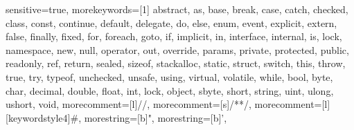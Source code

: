 {
	sensitive=true,
	morekeywords=[1]{
		abstract, as, base, break, case,
		catch, checked, class, const, continue,
		default, delegate, do, else, enum,
		event, explicit, extern, false,
		finally, fixed, for, foreach, goto, if,
		implicit, in, interface, internal, is,
		lock, namespace, new, null, operator,
		out, override, params, private,
		protected, public, readonly, ref,
		return, sealed, sizeof, stackalloc,
		static, struct, switch, this, throw,
		true, try, typeof, unchecked, unsafe,
		using, virtual, volatile, while, bool,
		byte, char, decimal, double, float,
		int, lock, object, sbyte, short, string,
		uint, ulong, ushort, void},
	morecomment=[l]{//},
	morecomment=[s]{/*}{*/},
	morecomment=[l][keywordstyle4]{\#},
	morestring=[b]",
	morestring=[b]',
}

\hypersetup{
    colorlinks,
    citecolor=black,
    filecolor=black,
    linkcolor=black,
    urlcolor=black
}

\renewcommand{\lstlistingname}{Príklad kódu}

\setlength{\parindent}{0cm}
\setlength{\parskip}{0.3cm}

\newcommand{\code}[1]{\texttt{\textbf{#1}}}

\newcommand{\refCode}[1]{\textbf{(Príklad kódu \ref{#1})}}